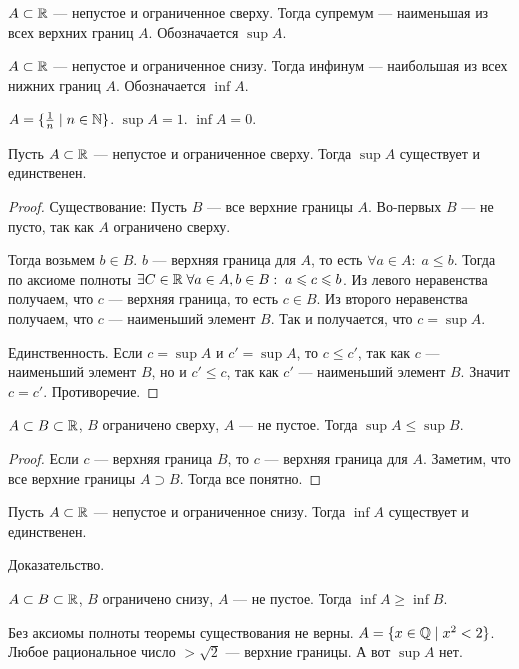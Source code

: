 \begin{definition}
    $A \subset \mathbb{R}$ --- непустое и ограниченное сверху. Тогда супремум --- наименьшая из всех верхних границ  $A$. Обозначается  $\sup A$.
\end{definition}
\begin{definition}
    $A \subset \mathbb{R}$ --- непустое и ограниченное снизу. Тогда инфинум --- наибольшая из всех нижних границ  $A$. Обозначается  $\inf A$.
\end{definition}
\begin{example}
    $A = \{\frac{1}{n} \mid n \in \mathbb{N}\}$. $\sup A = 1$.  $\inf A = 0$. 
\end{example}
\begin{theorem}
    Пусть $A \subset \mathbb{R}$ --- непустое и ограниченное сверху. Тогда  $\sup A$ существует и единственен. 
\end{theorem}
\begin{proof}
    Существование:
    Пусть $B$ --- все верхние границы $A$. Во-первых $B$ --- не пусто, так как $A$ ограничено сверху.

    Тогда возьмем  $b \in B$. $b$ --- верхняя граница для  $A$, то есть  $\forall a \in A: \; a \le b$. Тогда по аксиоме полноты $\exists C \in \mathbb{R} \; \forall a \in A, b \in B: \; a \leqslant c \leqslant b$. Из левого неравенства получаем, что $c$ --- верхняя граница, то есть  $c \in B$. Из второго неравенства получаем, что  $c$ --- наименьший элемент $B$. Так и получается, что  $c = \sup A$.

    Единственность. Если $c = \sup A$ и  $c' = \sup A$, то  $c \le c'$, так как $c$ --- наименьший элемент  $B$, но и  $c' \le c$, так как $c'$ --- наименьший элемент $B$. Значит  $c = c'$. Противоречие.
\end{proof}
\begin{consequence}
    $A \subset B \subset \mathbb{R}$,  $B$ ограничено сверху,  $A$ --- не пустое. Тогда  $\sup A \le \sup B$.
\end{consequence}
\begin{proof}
    Если $c$ --- верхняя граница  $B$, то  $c$ --- верхняя граница для  $A$. Заметим, что все верхние границы  $A \supset B$. Тогда все понятно. 
\end{proof}

\begin{theorem}
    Пусть $A \subset \mathbb{R}$ --- непустое и ограниченное снизу. Тогда  $\inf A$ существует и единственен. 
\end{theorem}
\begin{exerc}
    Доказательство. 
\end{exerc}
\begin{consequence}
    $A \subset B \subset \mathbb{R}$,  $B$ ограничено снизу,  $A$ --- не пустое. Тогда  $\inf A \ge \inf B$.
\end{consequence}
\begin{remark}
    Без аксиомы полноты теоремы существования не верны. $A = \{x \in \mathbb{Q}\mid x^2 < 2\}$. Любое рациональное число  $>\sqrt{2}$ --- верхние границы. А вот  $\sup A$ нет.
\end{remark}

